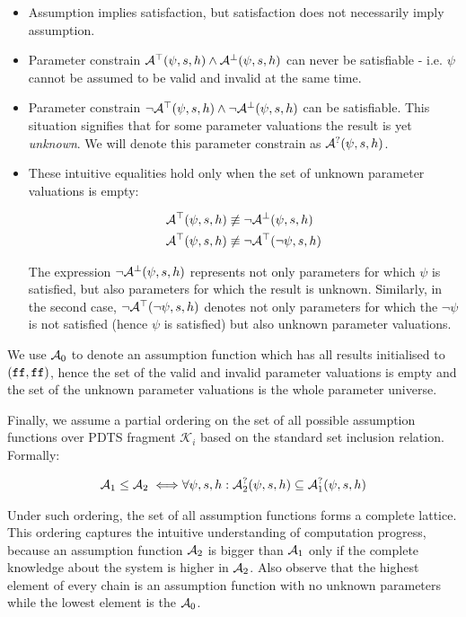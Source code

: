 \begin{itemize}
	\item Assumption implies satisfaction, but satisfaction does not necessarily imply assumption.
	\item Parameter constrain $\mathcal{A}^\top(\psi, s, h) \land \mathcal{A}^\bot(\psi, s, h)$ can never be satisfiable - i.e. $\psi$ cannot be assumed to be valid and invalid at the same time.
	\item Parameter constrain $\neg\mathcal{A}^\top(\psi, s, h) \land \neg\mathcal{A}^\bot(\psi, s, h)$ can be satisfiable. This situation signifies that for some parameter valuations the result is yet \emph{unknown}. We will denote this parameter constrain as $\mathcal{A}^?(\psi, s, h)$.
	\item These intuitive equalities hold only when the set of unknown parameter valuations is empty:
	
	\begin{align*}
		\mathcal{A}^\top(\psi, s, h) & \not\equiv \neg \mathcal{A}^\bot(\psi, s, h) \\
		\mathcal{A}^\top(\psi, s, h) & \not\equiv \neg \mathcal{A}^\top(\neg \psi, s, h)
	\end{align*}
	
	The expression $\neg \mathcal{A}^\bot(\psi, s, h)$ represents not only parameters for which $\psi$ is satisfied, but also parameters for which the result is unknown. Similarly, in the second case, $\neg \mathcal{A}^\top(\neg \psi, s, h)$ denotes not only parameters for which the $\neg \psi$ is not satisfied (hence $\psi$ is satisfied) but also unknown parameter valuations.
	
\end{itemize}

We use $\mathcal{A}_0$ to denote an assumption function which has all results initialised to $(\texttt{ff}, \texttt{ff})$, hence the set of the valid and invalid parameter valuations is empty and the set of the unknown parameter valuations is the whole parameter universe.

Finally, we assume a partial ordering on the set of all possible assumption functions over \ac{PDTS} fragment $\mathcal{K}_i$ based on the standard set inclusion relation. Formally:

\begin{align*}
	\mathcal{A}_1 \leq \mathcal{A}_2 \iff & \forall \psi, s, h : \mathcal{A}^?_2(\psi, s, h) \subseteq \mathcal{A}^?_1(\psi, s, h) \\
\end{align*}

Under such ordering, the set of all assumption functions forms a complete lattice. This ordering captures the intuitive understanding of computation progress, because an assumption function $\mathcal{A}_2$ is bigger than $\mathcal{A}_1$ only if the complete knowledge about the system is higher in $\mathcal{A}_2$. Also observe that the highest element of every chain is an assumption function with no unknown parameters while the lowest element is the $\mathcal{A}_0$. 

